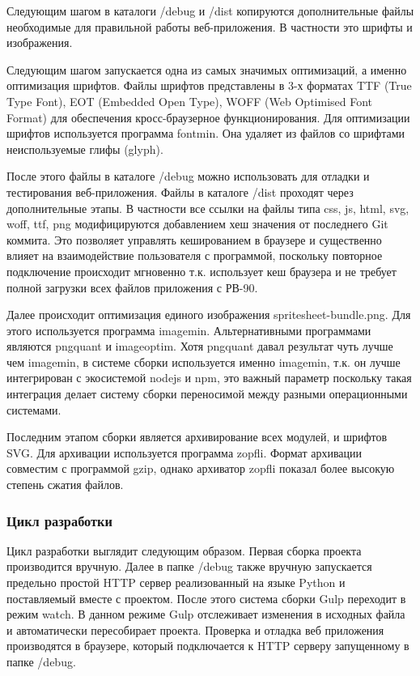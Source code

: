 Следующим шагом в каталоги /debug и /dist копируются дополнительные файлы необходимые для правильной работы веб-приложения. В частности это шрифты и изображения.

Следующим шагом запускается одна из самых значимых оптимизаций, а именно оптимизация шрифтов. Файлы шрифтов представлены в 3-х форматах TTF (True Type Font), EOT (Embedded Open Type), WOFF (Web Optimised Font Format) для обеспечения кросс-браузерное функционирования. Для оптимизации шрифтов используется программа fontmin. Она удаляет из файлов со шрифтами неиспользуемые глифы (glyph).

После этого файлы в каталоге /debug можно использовать для отладки и тестирования веб-приложения. Файлы в каталоге /dist проходят через дополнительные этапы. В частности все ссылки на файлы типа css, js, html, svg, woff, ttf, png модифицируются добавлением хеш значения от последнего Git коммита. Это позволяет управлять кешированием в браузере и существенно влияет на взаимодействие пользователя с программой, поскольку повторное подключение происходит мгновенно т.к. использует кеш браузера и не требует полной загрузки всех файлов приложения с РВ-90.    

Далее происходит оптимизация единого изображения spritesheet-bundle.png. Для этого используется программа imagemin. Альтернативными программами являются pngquant и imageoptim. Хотя pngquant давал результат чуть лучше чем imagemin, в системе сборки используется именно imagemin, т.к. он лучше интегрирован с экосистемой nodejs и npm, это важный параметр поскольку такая интеграция делает систему сборки переносимой между разными операционными системами. 

Последним этапом сборки является архивирование всех модулей, и шрифтов SVG. Для архивации используется программа zopfli. Формат архивации совместим с программой gzip, однако архиватор zopfli показал более высокую степень сжатия файлов.

\subsubsection{Цикл разработки}
Цикл разработки выглядит следующим образом. Первая сборка проекта производится вручную. Далее в папке /debug также вручную запускается предельно простой HTTP сервер реализованный на языке Python и поставляемый вместе с проектом. После этого система сборки Gulp переходит в режим watch. В данном режиме Gulp отслеживает изменения в исходных файла и автоматически пересобирает проекта. Проверка и отладка веб приложения производятся в браузере, который подключается к HTTP серверу запущенному в папке /debug. 


